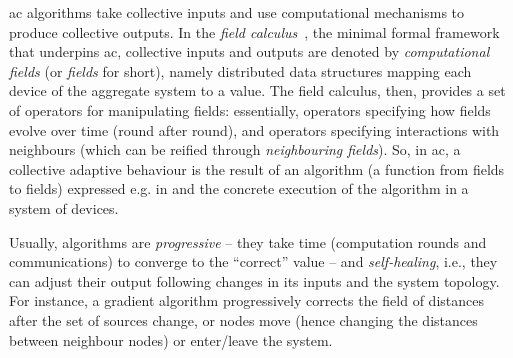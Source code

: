 \ac{ac} algorithms 
 take collective inputs
 and use computational mechanisms
 to produce collective outputs.
%
In the \emph{field calculus}~\cite{DBLP:journals/jlap/ViroliBDACP19},
 the minimal formal framework 
 that underpins \ac{ac},
 collective inputs and outputs are denoted by
 \emph{computational fields} (or \emph{fields} for short), namely
 distributed data structures 
 mapping each device of the aggregate system to a value.
%
The field calculus, then, provides a set of operators
 for manipulating fields:
 essentially, operators specifying how fields evolve over time (round after round),
 and operators specifying interactions with neighbours
 (which can be reified through \emph{neighbouring fields}).
%
%
%
So, in \ac{ac}, a collective adaptive behaviour
 is the result of an algorithm (a function from fields to fields) expressed e.g. in \scafi{}
 and the concrete execution of the algorithm
 in a system of devices.
%

%
Usually, algorithms are \emph{progressive} -- they take time (computation rounds and communications) to converge to the ``correct'' value --
and \emph{self-healing}, i.e., they can adjust their output following changes in its inputs and the system topology.
%
For instance, a gradient algorithm progressively corrects the field of distances after the set of sources change, or nodes move (hence changing the distances between neighbour nodes) or enter/leave the system.
%

